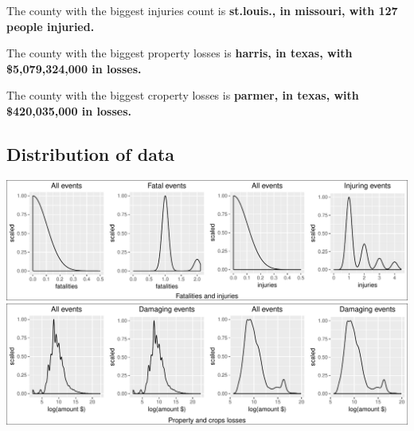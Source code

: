 \documentclass[]{article}
\begin{document}
The county with the biggest injuries count is \textbf{st.louis., in
missouri, with 127 people injuried.}

The county with the biggest property losses is \textbf{harris, in texas,
with \$5,079,324,000 in losses.}

The county with the biggest croperty losses is \textbf{parmer, in texas,
with \$420,035,000 in losses.}

\subsection{Distribution of data}\label{distribution-of-data}

\includegraphics{readme_files/figure-latex/distribution-1.pdf}
\includegraphics{readme_files/figure-latex/distribution-2.pdf}
\end{document}
